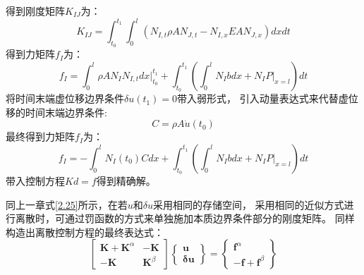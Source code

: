 得到刚度矩阵$K_{IJ}$为：
\begin{equation}\label{3.10}
K_{IJ} = \int_{t_0}^{t_1} \int_{0}^{l} (N_{I,t} \rho A N_{J,t} - N_{I,x}EAN_{J,x})dxdt
\end{equation}
得到力矩阵$f_I$为：
\begin{equation}\label{3.11}
f_{I} = \int_{0}^{l} \rho A N_I  N_{I,t} dx \vert_{t_0}^{t_1} + \int_{t_0}^{t_1} (\int_{0}^{l} N_{I} b dx + N_{I} P \vert_{x=l})dt
\end{equation}
将时间末端虚位移边界条件$\delta u (t_1) = 0$带入弱形式，
引入动量表达式来代替虚位移的时间末端边界条件:
\begin{equation}\label{3.12}
C = \rho A \dot u(t_0)
\end{equation}
最终得到力矩阵$f_I$为：
\begin{equation}\label{3.13}
f_{I} = - \int_{0}^{l} N_I(t_0) C dx   + \int_{t_0}^{t_1} (\int_{0}^{l} N_{I} b dx + N_{I} P \vert_{x=l})dt
\end{equation}
带入控制方程$Kd = f$得到精确解。

同上一章式\ref{2.25}所示，在若$u$和$\delta u$采用相同的存储空间，
采用相同的近似方式进行离散时，可通过罚函数的方式来单独施加本质边界条件部分的刚度矩阵。
同样构造出离散控制方程的最终表达式：
\begin{equation}\label{3.14}
\begin{bmatrix}
\boldsymbol K + \boldsymbol K^\alpha & -\boldsymbol K \\ -\boldsymbol K & \boldsymbol K^\beta
\end{bmatrix}
\begin{Bmatrix}
\boldsymbol u \\ \boldsymbol {\delta u}
\end{Bmatrix} =
\begin{Bmatrix}
 \boldsymbol f^\alpha \\ -\boldsymbol f + \boldsymbol f^\beta
\end{Bmatrix}
\end{equation}


